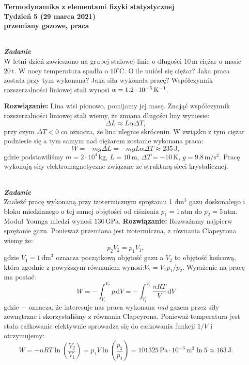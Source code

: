 \documentclass[11pt,a4paper]{article}
\newcounter{zadanie}\newcommand{\zadanie}[1][]{\addtocounter{zadanie}{1} ~\\  {\bf \emph{Zadanie \arabic{zadanie} #1 }} \\}
\renewcommand{\t}[1]{\textrm{#1}}
\begin{document}

\begin{centering}
\bf{\Large{Termodynamika z elementami fizyki statystycznej}}\\
Tydzień 5  (29 marca 2021)\\[3mm]
przemiany gazowe, praca \\
\end{centering}
\vspace{5mm}

\zadanie
W letni dzień zawieszono na grubej stalowej linie o długości $10\,$m ciężar o masie $20\,$t.
W nocy temperatura spadła o $10^\circ$C. O ile uniósł się ciężar?
Jaka praca została przy tym wykonana? Jaka siła wykonała pracę?
Współczynnik rozszerzalności liniowej stali wynosi $\alpha = 1.2\cdot 10^{-5}\,{\rm K}^{-1}$.
\vskip 10pt

\textbf{Rozwiązanie:}
Lina wisi pionowo, pomijamy jej masę. Znająć współczynnik rozszerzalności liniowej stali wiemy, że
zmiana długości liny wyniesie:
$$
\Delta L \approx L \alpha \Delta T,
$$
przy czym $\Delta T < 0$ co oznacza, że lina ulegnie skróceniu. W związku z tym ciężar podniesie się
a tym samym nad ciężarem zostanie wykonana praca:
$$
W = - mg \Delta L = - mg L \alpha \Delta T \approx 235\,\t{J},
$$
gdzie podstawiliśmy $m=2 \cdot 10^4\,\t{kg}$, $L = 10\,\t{m}$, $\Delta T = -10\,\t{K}$, $g=9.8\,\t{m}/\t{s}^2$.
Pracę wykonują siły elektromagnetyczne związane ze strukturą sieci krystalicznej.

\newpage
\zadanie
Znaleźć pracę wykonaną przy izotermicznym sprężaniu 1 dm$^3$
gazu doskonałego i bloku miedzianego o tej samej objętości od
ciśnienia $p_1=1\,$atm do $p_2=5\,$atm. Moduł Younga miedzi wynosi $130\,$GPa.
\vskip 10pt
\textbf{Rozwiązanie:}
Rozważamy najpierw sprężanie gazu. Ponieważ przemiana jest izotermiczna, z równania Clapeyrona wiemy że:
$$
p_2 V_2 = p_1 V_1,
$$
gdzie $V_1=1\,\t{dm}^3$ oznacza początkową objętość gazu a $V_2$ to objętość końcową, która zgodnie z powyższym równaniem
wynosi:$V_2 =V_1 p_1/p_2$.
Wyrażenie na pracę ma postać:
$$
W = - \int_{V_1}^{V_2} p \,\t{d}V = - \int_{V_1}^{V_2} \frac{n R T}{V} \,\t{d}V
$$
gdzie $-$ oznacza, że interesuje nas praca wykonana \emph{nad} gazem przez siły zewnętrzne i skorzystaliśmy z równania Clapeyrona.
Ponieważ temperatura jest stała całkowanie efektywnie sprowadza się do całkowania funkcji $1/V$ i otrzymujemy:
$$
W = - n R T \ln\left(\frac{V_2}{V_1} \right) = p_1 V \ln\left(\frac{p_2}{p_1}\right) = 
101325\,\t{Pa}\cdot 10^{-3}\,\t{m}^3 \ln 5 \approx 163\, \t{J}.
$$
\end{document}
